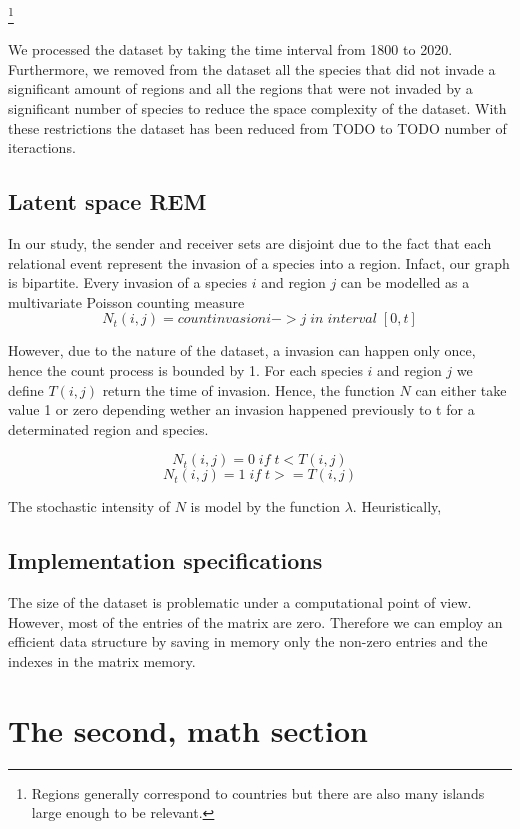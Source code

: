 \documentclass[mscthesis]{usiinfthesis}
\begin{document}

\footnote{Regions generally correspond to countries but there are also many islands large enough to be relevant.}

We processed the dataset by taking the time interval from 1800 to 2020. Furthermore, we removed from the dataset all the species that did not invade a significant amount of regions and all the regions that were not invaded by a significant number of species to reduce the space complexity of the dataset. With these restrictions the dataset has been reduced from TODO to TODO number of iteractions.

\subsection{Latent space REM}
In our study, the sender and receiver sets are disjoint due to the fact that each relational event represent the invasion of a species into a region. Infact, our graph is bipartite. 
Every invasion of a species $i$ and region $j$ can be modelled as a multivariate Poisson counting measure $$N_t(i, j) = count{invasion i -> j \; in \; interval \; [0, t]}$$

However, due to the nature of the dataset, a invasion can happen only once, hence the count process is bounded by 1. For each species $i$ and region $j$ we define $T(i, j)$ return the time of invasion. Hence, the function $N$ can either take value 1 or zero depending wether an invasion happened previously to t for a determinated region and species.

\[
N_t(i, j) = 0 \; if \; t < T(i, j)
\]
\[
N_t(i, j) = 1 \; if \; t >= T(i, j)
\]

The stochastic intensity of $N$ is model by the function $\lambda$. Heuristically, 


\subsection{Implementation specifications}
The size of the dataset is problematic under a computational point of view. However, most of the entries of the matrix are zero. Therefore we can employ an efficient data structure by saving in memory only the non-zero entries and the indexes in the matrix memory. 

\section{The second, math section}
\end{document}
